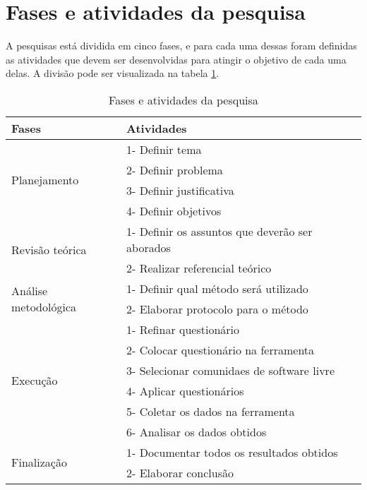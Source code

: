 \section{Fases e atividades da pesquisa}
\label{atv-da-pesquisa}
A pesquisas está dividida em cinco fases, e para cada uma dessas foram definidas as atividades que devem ser desenvolvidas para atingir o objetivo de cada uma delas. A divisão pode ser visualizada na tabela \ref{tab:fas-atv-pesq}.

\begin{table}[H]
\center
\begin{tabular}{|l|l|}
\hline
\textbf{Fases} & \textbf{Atividades} \\ \hline
\multirow{4}{*}{Planejamento} 
		& 1- Definir tema \\
		& 2- Definir problema \\
		& 3- Definir justificativa \\
		& 4- Definir objetivos \\ \hline
\multirow{2}{*}{Revisão teórica}
		& 1- Definir os assuntos que deverão ser aborados \\
		& 2- Realizar referencial teórico\\ \hline
\multirow{2}{*}{Análise metodológica}
		& 1- Definir qual método será utilizado \\
		& 2- Elaborar protocolo para o método \\ \hline
\multirow{6}{*}{Execução} 
		& 1- Refinar questionário \\
		& 2- Colocar questionário na ferramenta\\
		& 3- Selecionar comunidaes de software livre \\
		& 4- Aplicar questionários \\
		& 5- Coletar os dados na ferramenta \\
		& 6- Analisar os dados obtidos \\ \hline
\multirow{2}{*}{Finalização} 
		& 1- Documentar todos os resultados obtidos \\
		& 2- Elaborar conclusão \\ \hline
\end{tabular}
\caption{Fases e atividades da pesquisa}
\label{tab:fas-atv-pesq}
\end{table}



